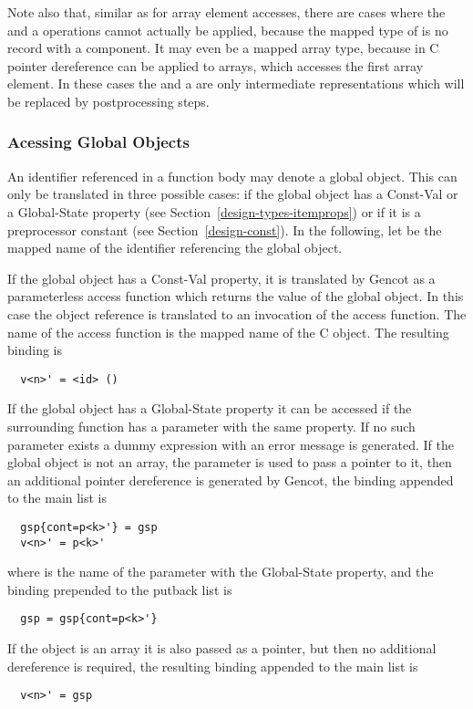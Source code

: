 Note also that, similar as for array element accesses, there are cases where the  and a  operations cannot
actually be applied, because the mapped type of  is no record with a  component. It may even be a mapped
array type, because in C pointer dereference can be applied to arrays, which accesses the first array element. In these cases
the  and a  are only intermediate representations which will be replaced by postprocessing steps.

\subsubsection{Acessing Global Objects}

An identifier referenced in a function body may denote a global object. This can only be translated in three possible cases: if
the global object has a Const-Val or a Global-State property (see Section~\ref{design-types-itemprops}) or if it is a
preprocessor constant (see Section~\ref{design-const}). In the following, let  be the mapped name of the identifier
referencing the global object.

If the global object has a Const-Val property, it is translated by Gencot as a parameterless access function which returns
the value of the global object. In this case the object reference is translated to an invocation of the access function. The
name of the access function is the mapped name of the C object. The resulting binding is
\begin{verbatim}
  v<n>' = <id> ()
\end{verbatim}

If the global object has a Global-State property it can be accessed if the surrounding function has a parameter with the same
property. If no such parameter exists a dummy expression with an error message is generated. If the global object is not an
array, the parameter is used to pass a pointer to it, then an additional pointer dereference is generated by Gencot, the
binding appended to the main list is
\begin{verbatim}
  gsp{cont=p<k>'} = gsp
  v<n>' = p<k>'
\end{verbatim}
where  is the name of the parameter with the Global-State property, and the binding prepended to the putback list is
\begin{verbatim}
  gsp = gsp{cont=p<k>'}
\end{verbatim}

If the object is an array it is also passed as a pointer, but then no additional dereference is required, the resulting
binding appended to the main list is
\begin{verbatim}
  v<n>' = gsp
\end{verbatim}

